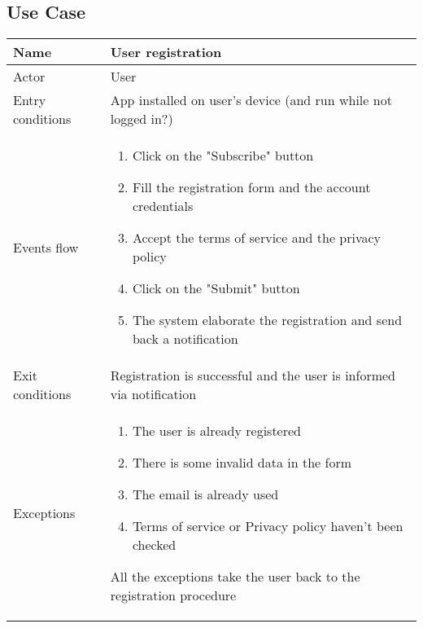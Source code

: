\subsection{Use Case}
\begin{table}[]
\begin{tabular}{|l|p{12cm}|}
\hline
Name             & User registration \\ \hline
Actor            & User \\ \hline
Entry conditions & App installed on user's device (and run while not logged in?) \\ \hline
Events flow      & \begin{enumerate}
\item Click on the "Subscribe" button
\item Fill the registration form and the account credentials
\item Accept the terms of service and the privacy policy
\item Click on the "Submit" button
\item The system elaborate the registration and send back a notification
\end{enumerate} 
\\ \hline
Exit conditions  & Registration is successful and the user is informed via notification \\ \hline
Exceptions       & \begin{enumerate}
\item The user is already registered
\item There is some invalid data in the form
\item The email is already used
\item Terms of service or Privacy policy haven't been checked
\end{enumerate} All the exceptions take the user back to the registration procedure \\ \hline
\end{tabular}
\end{table}

